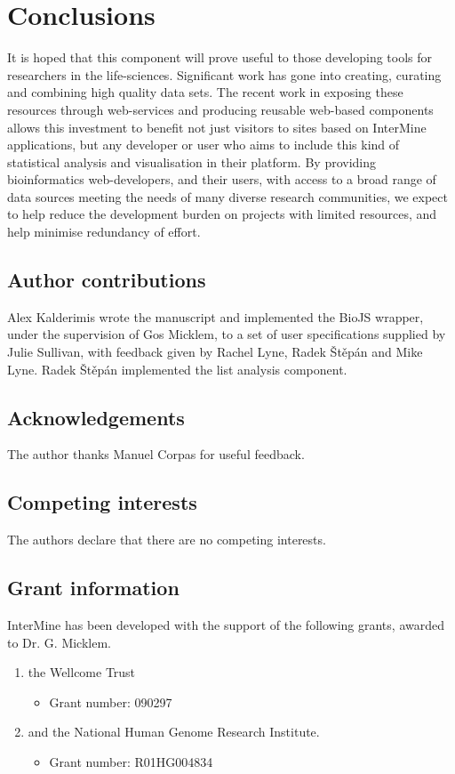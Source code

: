 \documentclass[10pt,a4paper,twocolumn]{article}
\begin{document}
\section*{Conclusions}

It is hoped that this component will prove useful to those developing tools for
researchers in the life-sciences. Significant work has gone into creating,
curating and combining high quality data sets. The recent work in exposing these
resources through web-services and producing reusable web-based components
allows this investment to benefit not just visitors to sites based on InterMine
applications, but any developer or user who aims to include this kind of
statistical analysis and visualisation in their platform. By providing
bioinformatics web-developers, and their users, with access to a broad range of
data sources meeting the needs of many diverse research communities, we
expect to help reduce the development burden on projects with limited resources,
and help minimise redundancy of effort.

\subsection*{Author contributions}

Alex Kalderimis wrote the manuscript and implemented the BioJS wrapper, under
the supervision of Gos Micklem, to a set of user specifications supplied by
Julie Sullivan, with feedback given by Rachel Lyne, Radek Štěpán and Mike Lyne.
Radek Štěpán implemented the list analysis component.

\subsection*{Acknowledgements}
The author thanks Manuel Corpas for useful feedback.

\subsection*{Competing interests}

The authors declare that there are no competing interests.

\subsection*{Grant information}
InterMine has been developed with the support of the following grants, awarded
to Dr. G. Micklem.

\begin{enumerate}
\item the Wellcome Trust
 \begin{itemize}
 \item{Grant number: 090297}
 \end{itemize}
\item and the National Human Genome Research Institute.
 \begin{itemize}
 \item{Grant number: R01HG004834}
 \end{itemize}
\end{enumerate}
\end{document}
